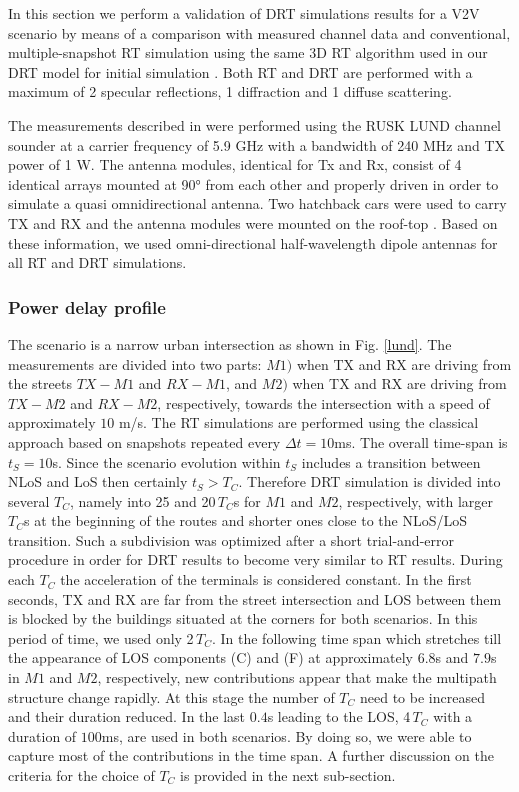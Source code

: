 In this section we perform a validation of DRT simulations results for a V2V scenario by means of a comparison with measured channel data \cite{abbas} and conventional, multiple-snapshot RT simulation using the same 3D RT algorithm used in our DRT model for initial simulation \cite{fuschini2015}. Both RT and DRT are performed with a maximum of 2 specular reflections, 1 diffraction and 1 diffuse scattering. \par
The measurements described in \cite{abbas} were performed using the RUSK LUND channel sounder at a carrier frequency of 5.9 GHz with a bandwidth of 240 MHz and TX power of 1 W. The antenna modules, identical for Tx and Rx, consist of 4 identical arrays mounted at 90° from each other and properly driven in order to simulate a quasi omnidirectional antenna. Two hatchback cars were used to carry TX and RX and the antenna modules were mounted on the roof-top \cite{paier2010}.  
Based on these information, we used  omni-directional half-wavelength dipole antennas for all RT and DRT simulations. 

\subsubsection{Power delay profile}
The scenario is a narrow urban intersection as shown in Fig. \ref{lund}. The measurements are divided into two parts: $M1)$ when TX and RX are driving from the streets $TX-M1$ and $RX-M1$, and $M2)$ when TX and RX are driving from $TX-M2$ and $RX-M2$, respectively, towards the intersection with a speed of approximately $10$ m/s. The RT simulations are performed using the classical approach based on snapshots repeated every $\Delta t=10$ms. The overall time-span is $t_S=10$s. Since the scenario evolution within $t_S$ includes a transition between NLoS and LoS then certainly $t_S>T_C$. Therefore DRT simulation is divided into several $T_C$, namely into 25 and 20\,$T_C$s for $M1$ and $M2$, respectively, with larger $T_C$s at the beginning of the routes and shorter ones close to the NLoS/LoS transition. Such a subdivision was optimized after a short trial-and-error procedure in order for DRT results to become very similar to RT results. During each $T_C$ the acceleration of the terminals is considered constant. 
In the first seconds, TX and RX are far from the street intersection and LOS between them is blocked by the buildings situated at the corners for both scenarios. In this period of time, we used only 2\,$T_C$. In the following time span which stretches till the appearance of LOS components (C) and (F) at approximately $6.8$s and $7.9$s in $M1$ and $M2$, respectively, new contributions appear that make the multipath structure change rapidly. At this stage the number of $T_C$ need to be increased and their duration reduced. In the last $0.4$s leading to the LOS, 4\,$T_C$ with a duration of $100$ms, are used in both scenarios. By doing so, we were able to capture most of the contributions in the time span. A further discussion on the criteria for the choice of $T_C$ is provided in the next sub-section. \par 

